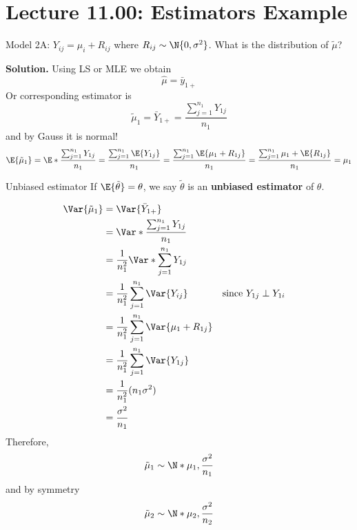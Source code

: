 \section{Lecture 11.00: Estimators Example}
\begin{Example}{}{}
    Model 2A\@: $ Y_{ij}=\mu_i+R_{ij} $ where $ R_{ij} \sim \N{0,\sigma^2} $.
    What is the distribution of $ \tilde{\mu} $?

    \textbf{Solution.} Using LS or MLE we obtain
    \[ \hat{\mu}=\bar{y}_{1+} \]
    Or corresponding estimator is
    \[ \tilde{\mu}_1=\bar{Y}_{1+}=\frac{\sum_{j=1}^{n_1}Y_{1j}}{n_1}  \]
    and by Gauss it is normal!
    \[
        \E{\tilde{\mu}_1}
        =\E*{\frac{\sum_{j=1}^{n_1} Y_{1j}}{n_1}}
        =\frac{\sum_{j=1}^{n_1}\E{Y_{1j}}}{n_1}
        =\frac{\sum_{j=1}^{n_1} \E{\mu_1+R_{1j}}}{n_1}
        =\frac{\sum_{j=1}^{n_1} \mu_1+\E{R_{1j}}}{n_1}
        =\mu_1
    \]
    \begin{Definition}{Unbiased estimator}{}
        If $ \E{\tilde{\theta}}=\theta $, we say $ \tilde{\theta} $
        is an \textbf{unbiased estimator} of $ \theta $.
    \end{Definition}
    \begin{align*}
        \Var{\tilde{\mu}_1}
         & =\Var{\bar{Y}_{1+}}                                                                       \\
         & =\Var*{\frac{\sum_{j=1}^{n_1} Y_{1j}}{n_1} }                                              \\
         & =\frac{1}{n_1^2}\Var*{\sum_{j=1}^{n_1} Y_{1j}}                                            \\
         & =\frac{1}{n_1^2} \sum_{j=1}^{n_1} \Var{Y_{ij}}       &  & \text{since }Y_{1j}\perp Y_{1i} \\
         & =\frac{1}{n_1^2} \sum_{j=1}^{n_1} \Var{\mu_1+R_{1j}}                                      \\
         & =\frac{1}{n_1^2} \sum_{j=1}^{n_1} \Var{Y_{1j}}                                            \\
         & =\frac{1}{n_1^2} (n_1\sigma^2)                                                            \\
         & =\frac{\sigma^2}{n_1}
    \end{align*}
    Therefore,
    \[ \tilde{\mu}_1\sim \N*{\mu_1,\frac{\sigma^2}{n_1}} \]
    and by symmetry
    \[ \tilde{\mu}_2 \sim \N*{\mu_2,\frac{\sigma^2}{n_2}} \]
\end{Example}
